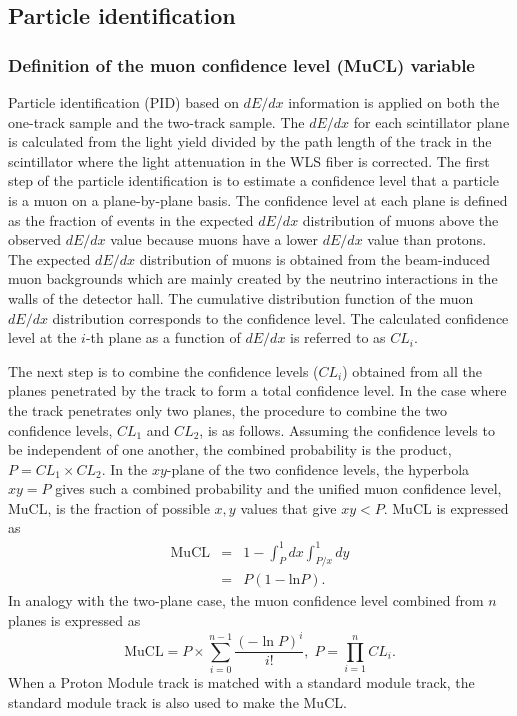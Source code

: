 \documentclass[%
 reprint,
superscriptaddress,
 amsmath,amssymb,
 aps,
]{revtex4-1}
\begin{document}
\subsection{Particle identification}
\subsubsection{Definition of the muon confidence level (MuCL) variable}
Particle identification (PID) based on $dE/dx$ information is applied on both the one-track sample and the two-track sample.
The $dE/dx$ for each scintillator plane is calculated from the light yield divided by the path length of the track in the scintillator where the light attenuation in the WLS fiber is corrected.
The first step of the particle identification is to estimate a confidence level that a particle is a muon on a plane-by-plane basis.
The confidence level at each plane is defined as the fraction of events in the expected $dE/dx$ distribution of muons above the observed $dE/dx$ value because muons have a lower $dE/dx$ value than protons.
The expected $dE/dx$ distribution of muons is obtained from the beam-induced muon backgrounds which are mainly created by the neutrino interactions in the walls of the detector hall.
The cumulative distribution function of the muon $dE/dx$ distribution corresponds to the confidence level.
The calculated confidence level at the $i$-th plane as a function of $dE/dx$ is referred to as $CL_i$.

The next step is to combine the confidence levels ($CL_i$) obtained from all the planes penetrated by the track to form a total confidence level.
In the case where the track penetrates only two planes, the procedure to combine the two confidence levels, $CL_1$ and $CL_2$, is as follows.
Assuming the confidence levels to be independent of one another, the combined probability is the product, $P=CL_1\times CL_2$.
In the $xy$-plane of the two confidence levels, the hyperbola $xy=P$ gives such a combined probability and the unified muon confidence level, MuCL, is the fraction of possible $x, y$ values that give $xy<P$.
MuCL is expressed as
\begin{eqnarray}
\mathrm{MuCL}&=&1-\int_{P}^{1}dx\int_{P/x}^{1}dy \nonumber \\
&=&P(1-\mathrm{ln}P).
\end{eqnarray}
In analogy with the two-plane case, the muon confidence level combined from $n$ planes is expressed as
\begin{equation}
\mathrm{MuCL} = P \times \sum_{i=0}^{n-1}\frac{(-\ln P)^i}{i!},\; P = \prod_{i=1}^{n}CL_i.
\end{equation}
When a Proton Module track is matched with a standard module track, the standard module track is also used to make the MuCL.
\end{document}
